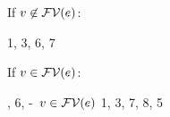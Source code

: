 \begin{bycase}

\Case{\Rthabs}
\begin{derivation}
\end{derivation}
\noindent
If $v\not\in\mathcal{FV}(e)$:
\begin{derivatioN}{5}
     {}
     {1, 3, 6, 7}
\end{derivatioN}
If $v\in\mathcal{FV}(e)$:
\begin{derivatioN}{5}
     {, 6, \hyp\ $v\in\mathcal{FV}(e)$}
     {1, 3, 7, 8, 5}
\end{derivatioN}

\Case{\Rthsub}
\begin{derivation}
\steP{\efvar{\app{\tspred}{\expr}}=\efvar{\tspred}\cup\efvar{\expr}}
\step{\hastyO{\expr}{\typ}}{\premof{\Rthsub}}
\end{derivation}


\end{bycase}
